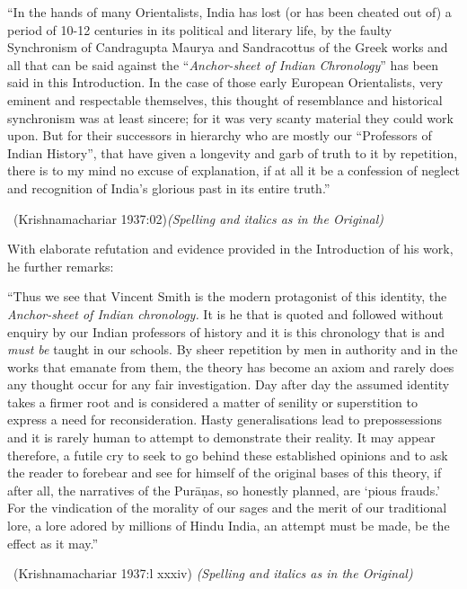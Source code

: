 \begin{myquote}
“In the hands of many Orientalists, India has lost (or has been cheated out of) a period of 10-12 centuries in its political and literary life, by the faulty Synchronism of Candragupta Maurya and Sandracottus of the Greek works and all that can be said against the “\textit{Anchor-sheet of Indian Chronology}” has been said in this Introduction. In the case of those early European Orientalists, very eminent and respectable themselves, this thought of resemblance and historical synchronism was at least sincere; for it was very scanty material they could work upon. But for their successors in hierarchy who are mostly our “Professors of Indian History”, that have given a longevity and garb of truth to it by repetition, there is to my mind no excuse of explanation, if at all it be a confession of neglect and recognition of India’s glorious past in its entire truth.” 

~\hfill (Krishnamachariar 1937:02)\textit{(Spelling and italics as in the Original)}
\end{myquote}

With elaborate refutation and evidence provided in the Introduction of his work, he further remarks:

\begin{myquote}
“Thus we see that Vincent Smith is the modern protagonist of this identity, the \textit{Anchor-sheet of Indian chronology.} It is he that is quoted and followed without enquiry by our Indian professors of history and it is this chronology that is and \textit{must be} taught in our schools. By sheer repetition by men in authority and in the works that emanate from them, the theory has become an axiom and rarely does any thought occur for any fair investigation. Day after day the assumed identity takes a firmer root and is considered a matter of senility or superstition to express a need for reconsideration. Hasty generalisations lead to prepossessions and it is rarely human to attempt to demonstrate their reality. It may appear therefore, a futile cry to seek to go behind these established opinions and to ask the reader to forebear and see for himself of the original bases of this theory, if after all, the narratives of the Purāṇas, so honestly planned, are ‘pious frauds.’ For the vindication of the morality of our sages and the merit of our traditional lore, a lore adored by millions of Hindu India, an attempt must be made, be the effect as it may.” 

~\hfill (Krishnamachariar 1937:l xxxiv) \textit{(Spelling and italics as in the Original)}
\end{myquote}

